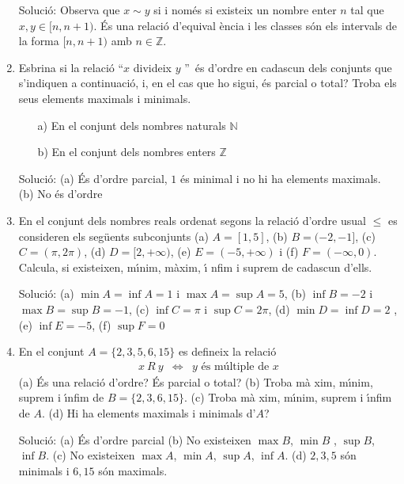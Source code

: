 \begin{enumerate}
Soluci\'{o}: Observa que $x\sim y$ si i nom\'{e}s si existeix un nombre
enter $n$ tal que $x,y\in \lbrack n,n+1)$. \'{E}s una relaci\'{o} d'equival%
\`{e}ncia i les classes s\'{o}n els intervals de la forma $[n,n+1)$ amb $%
n\in \mathbb{Z}$.

\item Esbrina si la relaci\'{o} \textquotedblleft $x$ divideix $y$%
\textquotedblright\ \'{e}s d'ordre en cadascun dels conjunts que s'indiquen
a continuaci\'{o}, i, en el cas que ho sigui, \'{e}s parcial o total? Troba
els seus elements maximals i minimals.

\begin{enumerate}
\item[a)] En el conjunt dels nombres naturals $\mathbb{N}$

\item[b)] En el conjunt dels nombres enters $\mathbb{Z}$
\end{enumerate}

Soluci\'{o}: (a) \'{E}s d'ordre parcial, $1$ \'{e}s minimal i no hi ha
elements maximals. (b) No \'{e}s d'ordre

\item En el conjunt dels nombres reals ordenat segons la relaci\'{o} d'ordre
usual $\leq $ es consideren els seg\"{u}ents subconjunts (a) $A=[1,5]$, (b) $%
B=(-2,-1]$, (c) $C=(\pi ,2\pi )$, (d) $D=[2,+\infty )$, (e) $E=(-5,+\infty )$
i (f) $F=(-\infty ,0)$. Calcula, si existeixen, m\'{\i}nim, m\`{a}xim, \'{\i}%
nfim i suprem de cadascun d'ells.

Soluci\'{o}: (a) $\min A=\inf A=1$ i $\max A=\sup A=5$, (b) $\inf B=-2$ i $%
\max B=\sup B=-1$, (c) $\inf C=\pi $ i $\sup C=2\pi $, (d) $\min D=\inf D=2$%
, (e) $\inf E=-5$, (f) $\sup F=0$

\item En el conjunt $A=\{2,3,5,6,15\}$ es defineix la relaci\'{o}%
\begin{equation*}
\begin{array}{ccc}
x~R~y & \Longleftrightarrow & y\text{ \'{e}s m\'{u}ltiple de }x%
\end{array}%
\end{equation*}%
(a) \'{E}s una relaci\'{o} d'ordre? \'{E}s parcial o total? (b) Troba m\`{a}%
xim, m\'{\i}nim, suprem i \'{\i}nfim de $B=\{2,3,6,15\}$. (c) Troba m\`{a}%
xim, m\'{\i}nim, suprem i \'{\i}nfim de $A$. (d) Hi ha elements maximals i
minimals d'$A$?

Soluci\'{o}: (a) \'{E}s d'ordre parcial (b) No existeixen $\max B$, $\min B$%
, $\sup B$, $\inf B$. (c) No existeixen $\max A$, $\min A$, $\sup A$, $\inf
A $. (d) $2,3,5$ s\'{o}n minimals i $6,15$ s\'{o}n maximals.


\end{enumerate}
